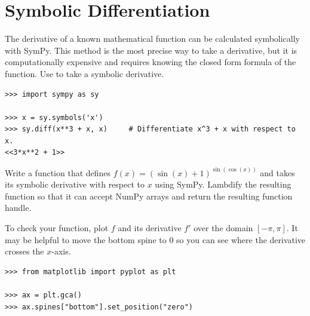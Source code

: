 \label{lab:Derivatives}

\section*{Symbolic Differentiation} %

The derivative of a known mathematical function can be calculated symbolically with SymPy.
This method is the most precise way to take a derivative, but it is computationally expensive and requires knowing the closed form formula of the function.
Use  to take a symbolic derivative.

\begin{lstlisting}
>>> import sympy as sy

>>> x = sy.symbols('x')
>>> sy.diff(x**3 + x, x)     # Differentiate x^3 + x with respect to x.
<<3*x**2 + 1>>
\end{lstlisting}

\begin{problem}
Write a function that defines $f(x) = (\sin(x) + 1)^{\sin(\cos(x))}$ and takes its symbolic derivative with respect to $x$ using SymPy.
Lambdify the resulting function so that it can accept NumPy arrays and return the resulting function handle.

To check your function, plot $f$ and its derivative $f'$ over the domain $[-\pi, \pi]$.
It may be helpful to move the bottom spine to $0$ so you can see where the derivative crosses the $x$-axis.
\begin{lstlisting}
>>> from matplotlib import pyplot as plt

>>> ax = plt.gca()
>>> ax.spines["bottom"].set_position("zero")
\end{lstlisting}
\label{prob:sympy-symbolic-diff}
\end{problem}

